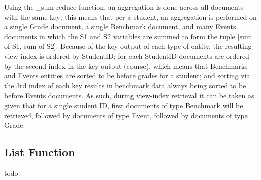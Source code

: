 Using the \_sum reduce function, an aggregation is done across all documents with the same key; this means that per a student, an aggregation is performed on a single Grade document, a single Benchmark document, and many Events documents in which the S1 and S2 variables are summed to form the tuple [sum of S1, sum of S2]. Because of the key output of each type of entity, the resulting view-index is ordered by StudentID; for each StudentID documents are ordered by the second index in the key output (course), which means that Benchmarks and Events entities are sorted to be before grades for a student; and sorting via the 3rd index of each key results in benchmark data always being sorted to be before Events documents. As such, during view-index retrieval it can be taken as given that for a single student ID, first documents of type Benchmark will be retrieved, followed by documents of type Event, followed by documents of type Grade.

\subsection{List Function}
todo